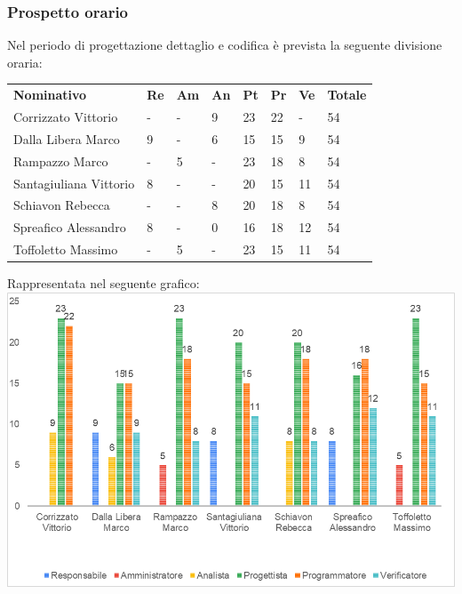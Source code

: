 \subsubsection{Prospetto orario}
Nel periodo di progettazione dettaglio e codifica è prevista la seguente divisione oraria:
\begin{longtable} {				
		>{}p{40mm}  
		>{}p{8mm}
		>{}p{8mm}
		>{}p{8mm}
		>{}p{8mm}
		>{}p{8mm}
		>{}p{8mm}
		>{}p{12mm}				
	}			
	\rowcolor{gray!50}
	\textbf{Nominativo} & \textbf{Re} & \textbf{Am} & \textbf{An} & \textbf{Pt} & \textbf{Pr} & \textbf{Ve} & \textbf{Totale}	\TBstrut \\ [2mm]
	Corrizzato Vittorio & - & - & 9 & 23 & 22 & - & 54 \TBstrut \\ [2mm]
	Dalla Libera Marco & 9 & - & 6 & 15 & 15 & 9 & 54 \TBstrut \\ [2mm]
	Rampazzo Marco & - & 5 & - & 23 & 18 & 8 & 54 \TBstrut \\ [2mm]
	Santagiuliana Vittorio & 8 & - & - & 20 & 15 & 11 & 54 \TBstrut \\ [2mm]
	Schiavon Rebecca & - & - & 8 & 20 & 18 & 8 & 54 \TBstrut \\ [2mm]
	Spreafico Alessandro & 8 & - & 0 & 16 & 18 & 12 & 54 \TBstrut \\ [2mm]
	Toffoletto Massimo & - & 5 & - & 23 & 15 & 11 & 54 \TBstrut \\ [2mm]
\end{longtable}
Rappresentata nel seguente grafico: \\
\includegraphics[width=\linewidth]{./img/Grafici/5.png}
